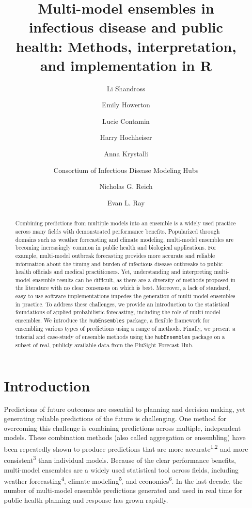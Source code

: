 \documentclass[
  letterpaper,
  DIV=11,
  numbers=noendperiod]{scrartcl}
\title{Multi-model ensembles in infectious disease and public health:
Methods, interpretation, and implementation in R}
\author{Li Shandross \and Emily Howerton \and Lucie Contamin \and Harry
Hochheiser \and Anna Krystalli \and Consortium of Infectious Disease
Modeling Hubs \and Nicholas G. Reich \and Evan L. Ray}
\date{}
\begin{document}
\maketitle
\begin{abstract}
Combining predictions from multiple models into an ensemble is a widely
used practice across many fields with demonstrated performance benefits.
Popularized through domains such as weather forecasting and climate
modeling, multi-model ensembles are becoming increasingly common in
public health and biological applications. For example, multi-model
outbreak forecasting provides more accurate and reliable information
about the timing and burden of infectious disease outbreaks to public
health officials and medical practitioners. Yet, understanding and
interpreting multi-model ensemble results can be difficult, as there are
a diversity of methods proposed in the literature with no clear
consensus on which is best. Moreover, a lack of standard, easy-to-use
software implementations impedes the generation of multi-model ensembles
in practice. To address these challenges, we provide an introduction to
the statistical foundations of applied probabilistic forecasting,
including the role of multi-model ensembles. We introduce the
\texttt{hubEnsembles} package, a flexible framework for ensembling
various types of predictions using a range of methods. Finally, we
present a tutorial and case-study of ensemble methods using the
\texttt{hubEnsembles} package on a subset of real, publicly available
data from the FluSight Forecast Hub.
\end{abstract}

\section{Introduction}\label{sec-intro}

Predictions of future outcomes are essential to planning and decision
making, yet generating reliable predictions of the future is
challenging. One method for overcoming this challenge is combining
predictions across multiple, independent models. These combination
methods (also called aggregation or ensembling) have been repeatedly
shown to produce predictions that are more accurate\textsuperscript{1,2}
and more consistent\textsuperscript{3} than individual models. Because
of the clear performance benefits, multi-model ensembles are a widely
used statistical tool across fields, including weather
forecasting\textsuperscript{4}, climate modeling\textsuperscript{5}, and
economics\textsuperscript{6}. In the last decade, the number of
multi-model ensemble predictions generated and used in real time for
public health planning and response has grown rapidly.
\end{document}
